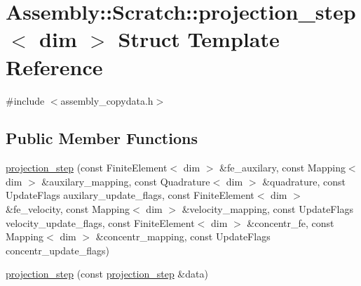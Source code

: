 \hypertarget{struct_assembly_1_1_scratch_1_1projection__step}{}\section{Assembly\+:\+:Scratch\+:\+:projection\+\_\+step$<$ dim $>$ Struct Template Reference}
\label{struct_assembly_1_1_scratch_1_1projection__step}


{\ttfamily \#include $<$assembly\+\_\+copydata.\+h$>$}

\subsection*{Public Member Functions}
\begin{DoxyCompactItemize}
\item 
\hyperlink{struct_assembly_1_1_scratch_1_1projection__step_ab68aa92ddfce17896f9bb3088cd707fc}{projection\+\_\+step} (const Finite\+Element$<$ dim $>$ \&fe\+\_\+auxilary, const Mapping$<$ dim $>$ \&auxilary\+\_\+mapping, const Quadrature$<$ dim $>$ \&quadrature, const Update\+Flags auxilary\+\_\+update\+\_\+flags, const Finite\+Element$<$ dim $>$ \&fe\+\_\+velocity, const Mapping$<$ dim $>$ \&velocity\+\_\+mapping, const Update\+Flags velocity\+\_\+update\+\_\+flags, const Finite\+Element$<$ dim $>$ \&concentr\+\_\+fe, const Mapping$<$ dim $>$ \&concentr\+\_\+mapping, const Update\+Flags concentr\+\_\+update\+\_\+flags)
\item 
\hyperlink{struct_assembly_1_1_scratch_1_1projection__step_aadd897036cbaca7f3a37e3c0b0289bbc}{projection\+\_\+step} (const \hyperlink{struct_assembly_1_1_scratch_1_1projection__step}{projection\+\_\+step} \&data)
\end{DoxyCompactItemize}
